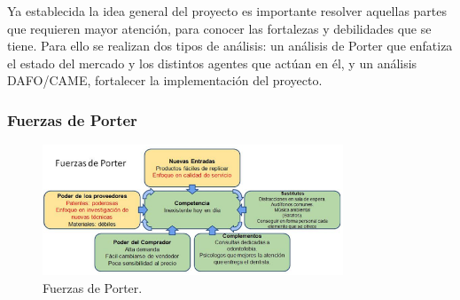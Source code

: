 \documentclass[letterpaper,12pt]{article}
\begin{document}
Ya establecida la idea general del proyecto es importante resolver aquellas partes que
requieren mayor atención, para conocer las fortalezas y debilidades que se tiene. Para ello se 
realizan dos tipos de análisis: un análisis de Porter que enfatiza el estado del mercado y los distintos agentes que actúan en él, y un análisis DAFO/CAME, fortalecer la implementación del proyecto.
		\newpage
		\subsubsection{Fuerzas de Porter}
			\begin{figure}[h!]
				\begin{center}
					\includegraphics[width=0.8\textwidth]{porter}
					\caption{Fuerzas de Porter.}
					\label{porter}
				\end{center}
			\end{figure}
\end{document}
